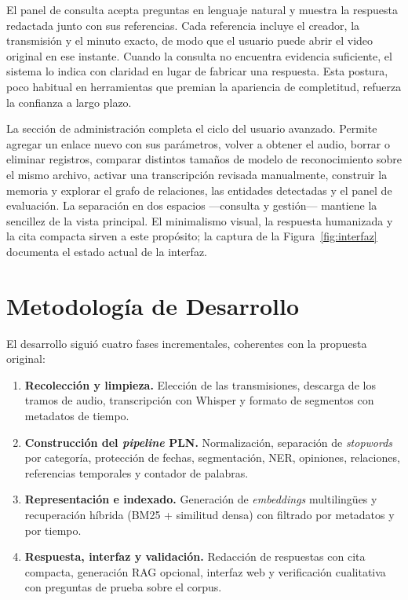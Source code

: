 \documentclass[12pt,a4paper]{article}
\begin{document}
El panel de consulta acepta preguntas en lenguaje natural y muestra la respuesta redactada junto con sus referencias. Cada referencia incluye el creador, la transmisión y el minuto exacto, de modo que el usuario puede abrir el video original en ese instante. Cuando la consulta no encuentra evidencia suficiente, el sistema lo indica con claridad en lugar de fabricar una respuesta. Esta postura, poco habitual en herramientas que premian la apariencia de completitud, refuerza la confianza a largo plazo.

La sección de administración completa el ciclo del usuario avanzado. Permite agregar un enlace nuevo con sus parámetros, volver a obtener el audio, borrar o eliminar registros, comparar distintos tamaños de modelo de reconocimiento sobre el mismo archivo, activar una transcripción revisada manualmente, construir la memoria y explorar el grafo de relaciones, las entidades detectadas y el panel de evaluación. La separación en dos espacios —consulta y gestión— mantiene la sencillez de la vista principal. El minimalismo visual, la respuesta humanizada y la cita compacta sirven a este propósito; la captura de la Figura~\ref{fig:interfaz} documenta el estado actual de la interfaz.


\section{Metodología de Desarrollo}
\label{sec:metodologia}

El desarrollo siguió cuatro fases incrementales, coherentes con la propuesta original:

\begin{enumerate}
  \item \textbf{Recolección y limpieza.} Elección de las transmisiones, descarga de los tramos de audio, transcripción con Whisper y formato de segmentos con metadatos de tiempo.
  \item \textbf{Construcción del \emph{pipeline} PLN.} Normalización, separación de \emph{stopwords} por categoría, protección de fechas, segmentación, NER, opiniones, relaciones, referencias temporales y contador de palabras.
  \item \textbf{Representación e indexado.} Generación de \emph{embeddings} multilingües y recuperación híbrida (BM25 + similitud densa) con filtrado por metadatos y por tiempo.
  \item \textbf{Respuesta, interfaz y validación.} Redacción de respuestas con cita compacta, generación RAG opcional, interfaz web y verificación cualitativa con preguntas de prueba sobre el corpus.
\end{enumerate}
\end{document}
